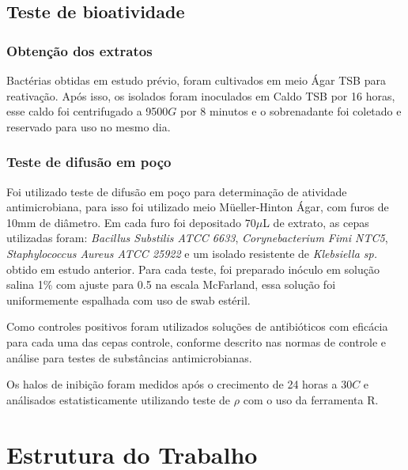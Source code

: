 \subsection{Teste de bioatividade}
\subsubsection{Obtenção dos extratos}
Bactérias obtidas em estudo prévio, foram cultivados em meio Ágar TSB para
reativação. Após isso, os isolados foram inoculados em Caldo TSB por 16 horas,
esse caldo foi centrifugado a 9500$G$ por 8 minutos e o sobrenadante foi coletado
e reservado para uso no mesmo dia.
\subsubsection{Teste de difusão em poço}
Foi utilizado teste de difusão em poço para determinação de atividade antimicrobiana,
para isso foi utilizado meio Müeller-Hinton Ágar, com furos de 10mm de diâmetro.
Em cada furo foi depositado $70\mu$L de extrato, as cepas utilizadas foram:
\textit{Bacillus Substilis ATCC 6633}, \textit{Corynebacterium Fimi NTC5}, \textit{Staphylococcus Aureus ATCC 25922}
e um isolado resistente de \textit{Klebsiella sp.} obtido em estudo anterior.
Para cada teste, foi preparado inóculo em solução salina 1\% com ajuste para 0.5
na escala McFarland, essa solução foi uniformemente espalhada com uso de swab estéril.

Como controles positivos foram utilizados soluções de antibióticos com
eficácia para cada uma das cepas controle, conforme descrito nas normas de controle e
análise para testes de substâncias antimicrobianas\cite{clsi2020}.

Os halos de inibição foram medidos após o crecimento de 24 horas a $30$\textdegree$C$
e análisados estatisticamente utilizando teste de $\rho$ com
o uso da ferramenta R.



\section{Estrutura do Trabalho}



